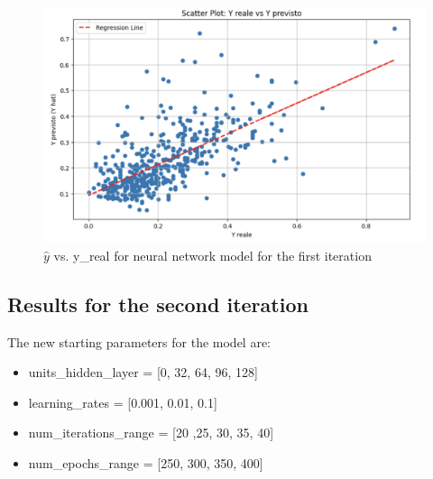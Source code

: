 \documentclass[10pt]{article} %
\begin{document}
    \begin{figure}
        \centering
        \includegraphics[scale=0.4]{Assets/iteration 1/rnn_it1_2.png}
        \caption{$\hat{y}$ vs. y\_real for neural network model for the first iteration}
        \label{fig:enter-label}
    \end{figure}

    \newpage
    \subsection{Results for the second iteration}

    The new starting parameters for the model are:
    \begin{itemize}
        \item  units\_hidden\_layer = [0, 32, 64, 96, 128]
        \item learning\_rates = [0.001, 0.01, 0.1]
        \item num\_iterations\_range = [20 ,25, 30, 35, 40]
        \item num\_epochs\_range = [250, 300, 350, 400]
    \end{itemize}
\end{document}
